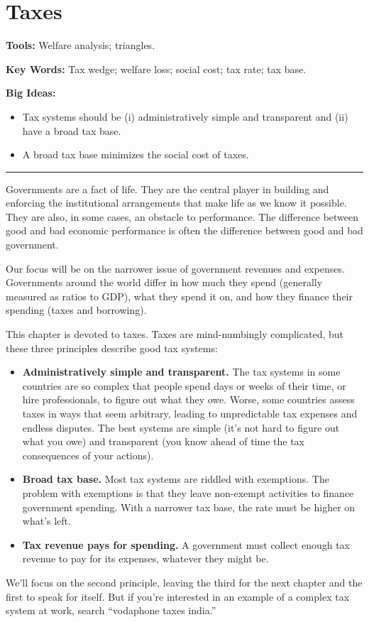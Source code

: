 \chapter{Taxes}\label{chp:tax}
\hypertarget{taxes}{}

\textbf{Tools:} Welfare analysis; triangles.

\textbf{Key Words:} Tax wedge; welfare loss; social cost; tax rate; tax base.

\textbf{Big Ideas:}
\vspace{-0.1in}
\begin{itemize}
\item Tax systems should be (i) administratively simple and transparent and (ii) have a broad tax base.
\item A broad tax base minimizes the social cost of taxes.
\end{itemize}
\rule{\textwidth}{1pt}

Governments are a fact of life. They are the central player in building and enforcing
the institutional arrangements that make %
life as we know it possible.
They are also, in some cases, an obstacle to performance.
The difference between good and bad economic performance
is often the difference between good and bad government.

Our focus will be on the narrower issue of government revenues and expenses.
Governments around the world differ
in how much they spend (generally measured as ratios to GDP),
what they spend it on,
and how they finance their spending (taxes and borrowing).

This chapter is devoted to taxes.
Taxes are mind-numbingly complicated, but these three principles
describe good tax systems:
%
\begin{itemize}
\item \textbf{Administratively simple and transparent.}
The tax systems in some countries are so complex that people spend
days or weeks of their time, or hire professionals, to figure out
what they owe.
Worse, some countries assess taxes in ways that seem arbitrary,
leading to unpredictable tax expenses and endless disputes.
The best systems are simple (it's not hard to figure out what you owe)
and transparent (you know ahead of time the tax consequences of your actions).

\item \textbf{Broad tax base.}
Most tax systems are riddled with exemptions.
The problem with exemptions is that they leave non-exempt activities to finance government spending.
With a narrower tax base, the rate must be higher on what's left.

\item \textbf{Tax revenue pays for spending.}
A government must collect enough tax revenue to pay for its expenses,
whatever they might be.
\end{itemize}
%
We'll focus on the second principle, leaving the third for the next chapter and the first to speak for itself.
But if you're interested in an example of a complex tax system
at work, search ``vodaphone taxes india.''


